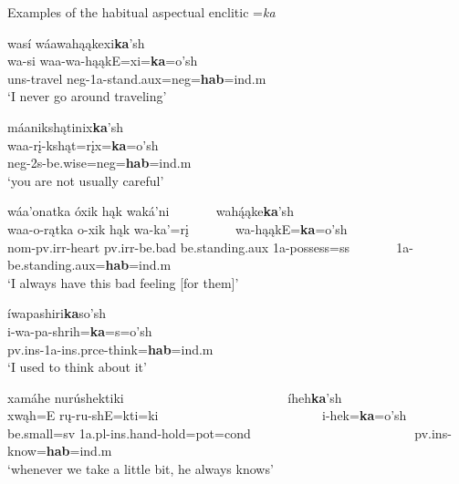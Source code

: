 \begin{exe}

\item\label{habitualaspectualencliticEx} Examples of the habitual aspectual enclitic =\textit{ka}

	\begin{xlist}
	
	\item\label{habitualaspectualenclitic1}
	
	\glll wasí wáawahąąkexi\textbf{ka}'sh\\
	wa-si waa-wa-hąąkE=xi=\textbf{ka}=o'sh\\
	uns-\textnormal{travel} neg-1a-\textnormal{stand}.aux=neg=\textbf{hab}=ind.m\\
	\glt `I never go around traveling' \citep[54]{hollow1973a}

	\item\label{habitualaspectualenclitic2}

	\glll máanikshątinix\textbf{ka}'sh\\
	waa-rį-kshąt=rįx=\textbf{ka}=o'sh\\
	neg-2s-\textnormal{be.wise}=neg=\textbf{hab}=ind.m\\
	\glt `you are not usually careful' \citep[444]{hollow1970}

	\item\label{habitualaspectualenclitic3}

	\glll wáa'onatka óxik hąk waká'ni ~ ~ ~ ~  wahą́ąke\textbf{ka}'sh\\
	waa-o-rątka o-xik hąk wa-ka'=rį ~ ~ ~ ~  wa-hąąkE=\textbf{ka}=o'sh\\
	nom-pv.irr-\textnormal{heart} pv.irr-\textnormal{be.bad} \textnormal{be.standing}.aux 1a-\textnormal{possess}=ss ~ ~ ~ ~  1a-\textnormal{be.standing}.aux=\textbf{hab}=ind.m\\
	\glt `I always have this bad feeling [for them]' \citep[56]{hollow1973a}

	\item\label{habitualaspectualenclitic4}

	 \glll íwapashiri\textbf{ka}so'sh\\
	 i-wa-pa-shrih=\textbf{ka}=s=o'sh\\
	 pv.ins-1a-ins.prce-\textnormal{think}=\textbf{hab}=ind.m\\
	\glt `I used to think about it' \citep[444]{hollow1970}

	\item\label{habitualaspectualenclitic5}
	\glll xamáhe nurúshektiki ~ ~ ~ ~ ~ ~ ~ ~ ~ ~ ~ ~ ~ ~ ~ íheh\textbf{ka}'sh\\
	xwąh=E rų-ru-shE=kti=ki ~ ~ ~ ~ ~ ~ ~ ~ ~ ~ ~ ~ ~ ~ ~  i-hek=\textbf{ka}=o'sh\\
	\textnormal{be.small}=sv 1a.pl-ins.hand-\textnormal{hold}=pot=cond ~ ~ ~ ~ ~ ~ ~ ~ ~ ~ ~ ~ ~ ~ ~ pv.ins-\textnormal{know}=\textbf{hab}=ind.m\\
	\glt `whenever we take a little bit, he always knows' \citep[116]{hollow1973b}
	
	\end{xlist}

\end{exe}

